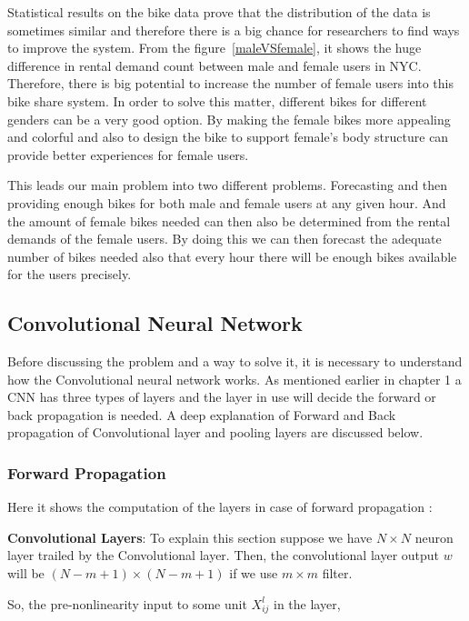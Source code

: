 Statistical results on the bike data prove that the distribution of the data is sometimes similar and therefore there is a big chance for researchers to find ways to improve the system. From the figure~\ref{maleVSfemale}, it shows the huge difference in rental demand count between male and female users in NYC. Therefore, there is big potential to increase the number of female users into this bike share system. In order to solve this matter, different bikes for different genders can be a very good option. By making the female bikes more appealing and colorful and also to design the bike to support female's body structure can provide better experiences for female users. 

This leads our main problem into two different problems. Forecasting and then providing enough bikes for both male and female users at any given hour. And the amount of female bikes needed can then also be determined from the rental demands of the female users. By doing this we can then forecast the adequate number of bikes needed also that every hour there will be enough bikes available for the users precisely.

\subsection{Convolutional Neural Network}
\label{CNNexpl}

Before discussing the problem and a way to solve it, it is necessary to understand how the Convolutional neural network works. As mentioned earlier in chapter 1 a CNN has three types of layers and the layer in use will decide the forward or back propagation is needed. A deep explanation of Forward and Back propagation of Convolutional layer and pooling layers are discussed below. 


\subsubsection{Forward Propagation}

Here it shows the computation of the layers in case of forward propagation :



\textbf {Convolutional Layers}:
To explain this section suppose we have $N \times N$ neuron layer trailed by the Convolutional layer. Then, the convolutional layer output $w$ will be $(N - m +1) \times (N - m + 1)$ if we use $m \times m$ filter. 

So, the pre-nonlinearity input to some unit $X_{ij}^{l}$  in the layer,  

